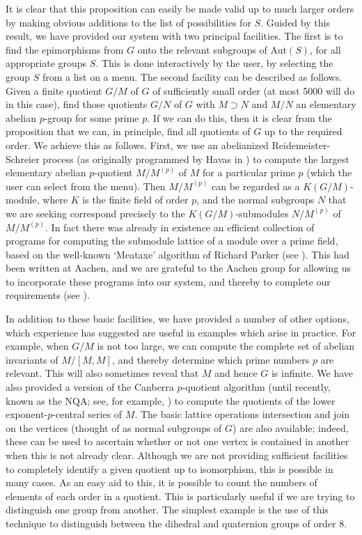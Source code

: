 It is clear that this proposition can easily be made valid up to much larger
orders by making obvious additions to the list of possibilities for $S$. 
Guided by this result, we have provided our system with two principal
facilities. The first is to find the epimorphisms from $G$ onto the
relevant subgroups of Aut$(S)$, for all appropriate groups $S$. This is done
interactively by the user, by selecting the group $S$ from a list on a menu.
The second facility can be described as follows. Given a finite quotient
$G/M$ of $G$ of sufficiently small order (at most 5000 will do in this case),
find those quotients $G/N$ of $G$ with $M \supset N$ and $M/N$ an elementary
abelian $p$-group for some prime $p$. If we can do this, then it is clear from
the proposition that we can, in principle, find all quotients of $G$ up to the
required order. We achieve this as follows. First, we use an abelianized
Reidemeister-Schreier process (as originally programmed by Havas in \cite {1})
to compute the largest elementary abelian
$p$-quotient $M/M^{(p)}$ of $M$ for a particular prime $p$ (which the user can
select from the menu). Then $M/M^{(p)}$ can be regarded as a $K(G/M)$-module,
where $K$ is the finite field of order $p$, and the normal subgroups $N$ that
we are seeking correspond precisely to the $K(G/M)$-submodules $N/M^{(p)}$ of
$M/M^{(p)}$.  In fact there was already in existence an efficient collection
of programs for computing the submodule lattice of a module over a prime
field, based on the well-known `Meataxe' algorithm of Richard Parker (see
\cite{10}). This had been written at Aachen, and we are grateful to the
Aachen group for allowing us to incorporate these programs into our system, 
and thereby to complete our requirements (see \cite{8}).

In addition to these basic facilities, we have provided a number of other
options, which experience has suggested are useful in examples which arise
in practice. For example, when $G/M$ is not too large, we can compute the
complete set of abelian invariants of $M/[M,M]$, and thereby determine
which prime numbers $p$ are relevant. This will also sometimes reveal that
$M$ and hence $G$ is infinite. We have also provided a version of the
Canberra $p$-quotient algorithm (until recently, known as the NQA; see, 
for example,
\cite{3}) to compute the quotients of the lower exponent-$p$-central series of
$M$.  The basic lattice operations intersection and join on the vertices
(thought of as normal subgroups of $G$) are also available; indeed, these can
be used to ascertain whether or not one vertex is contained in another when
this is not already clear. Although we are not providing sufficient facilities
to completely identify a given quotient up to isomorphism, this is possible in
many cases. As an easy aid to this, it is possible to count the numbers of
elements of each order in a quotient. This is particularly useful if we are
trying to distinguish one group from another. The simplest example is the
use of this technique to distinguish between the dihedral and quaternion
groups of order 8.

